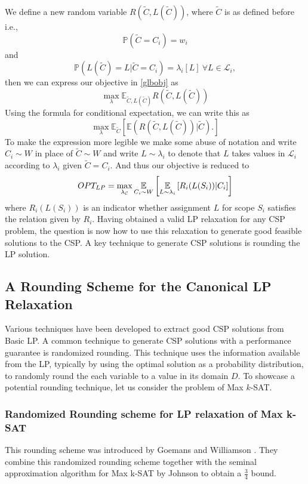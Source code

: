 We define a new random variable $R(\tilde{C}, L(\tilde{C}))$, where $\tilde{C}$ is as defined before i.e., 
$$\mathbb{P} (\tilde{C} = C_i ) = w_i$$
and 
$$\mathbb{P}(L(\tilde{C}) = L |\tilde{C}=C_i ) =  \lambda_i[L]\  \forall L \in \mathcal{L}_i,$$ 
then we can express our objective in \ref{glbobj} as 
\begin{equation}
\max_\lambda \mathbb{E}_{\tilde{C}, L(\tilde{C})} R(\tilde{C}, L(\tilde{C}))
\end{equation}
Using the formula for conditional expectation, we can write this as 
\begin{equation}
\max_\lambda \mathbb{E}_{\tilde{C}} \left[ \mathbb{E} \left(R(\tilde{C}, L(\tilde{C}))\displaystyle|\tilde{C}\right). \right] \label{eq:tower}
\end{equation}
To make the expression more legible we make some abuse of notation and write $C_i \sim W$ in place of $\tilde{C} \sim W$ and write $L \sim \lambda_i$ to denote that $L$ takes values in $\mathcal L_i$ according to $\lambda_i$ given $\tilde{C} = C_i$. And thus our objective is reduced to
\[
	OPT_{LP} = \max_{\lambda_{\mathcal{C}}} \underset{C_i \sim W}{\mathbb{E}} \left[ \underset{L \sim \lambda_{i}}{\mathbb{E}} \left[ R_i( L (S_i )) |C_i \right] \right]
\]
where $R_i( L (S_i ))$ is an indicator whether assignment $L$ for scope $S_i$ satisfies the relation given by $R_i$.
Having obtained a valid LP relaxation for any CSP problem, the question is now how to use this relaxation to generate good feasible solutions to the CSP. 
A key technique to generate CSP solutions is rounding the LP solution.


\subsection{A Rounding Scheme for the Canonical LP Relaxation}
Various techniques have been developed to extract good CSP solutions from Basic LP.
A common technique to generate CSP solutions with a performance guarantee is randomized rounding.
This technique uses the information available from the LP, typically by using the optimal solution as a probability distribution, to randomly round the each variable to a value in its domain $D$.
To showcase a potential rounding technique, let us consider the problem of Max $k$-SAT. 

\subsubsection{Randomized Rounding scheme for LP relaxation of Max k-SAT}\label{sec:lpRoundingSat}
This rounding scheme was introduced by Goemans and Williamson \cite{GoeWil94}. They combine this randomized rounding scheme together with the seminal approximation algorithm for Max k-SAT by Johnson \cite{Joh73} to obtain a $\frac{3}{4}$ bound.
 

